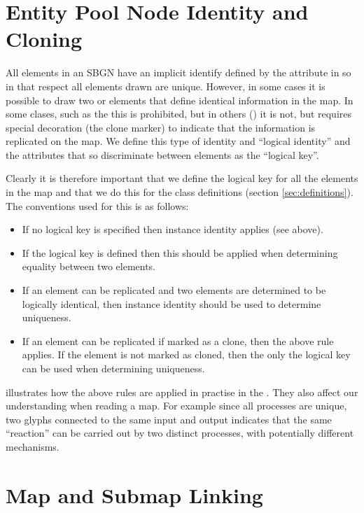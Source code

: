\section{Entity Pool Node Identity and Cloning}
\label{sec:epnuniqueness}
\label{sec:uniquenessdefinition}

All elements in an SBGN \PDm have an implicit identify defined by the
 attribute in  so in that respect all
elements drawn are unique. However, in some cases it is possible to
draw two or elements that define identical information in the map. In
some clases, such as the  this is prohibited, but in
others () it is not, but requires
special decoration (the clone marker) to indicate that the information
is replicated on the map. We define this type of identity and
``logical identity'' and the attributes that so discriminate between
elements as the ``logical key''.

Clearly it is therefore important that we define the logical key for
all the elements in the map and that we do this for the class definitions
(section \ref{sec:definitions}). The conventions used for this is as
follows:

\begin{itemize}
\item If no logical key is specified then instance identity applies
  (see above).
\item If the logical key is defined then this should be applied when
  determining equality between two elements.
\item If an element can be replicated and two elements are determined
  to be logically identical, then instance identity should be used to
  determine uniqueness.
\item If an element can be replicated if marked as a clone, then the
  above rule applies. If the element is not marked as cloned, then the
  only the logical key can be used when determining uniqueness.
\end{itemize}

 illustrates how the above rules are applied in
practise in the \PDm. They also affect our understanding when reading
a map. For example since all processes are unique, two 
glyphs connected to the same input and output indicates that the same
``reaction'' can be carried out by two distinct processes, with
potentially different mechanisms.

\section{Map and Submap Linking}
\label{sec:mapsubmaps}
\label{sec:submaplinkingsemantics}


